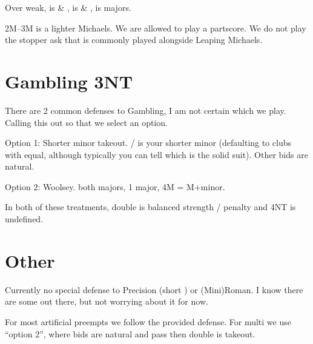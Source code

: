\documentclass[tom-ari]{subfile}
\begin{document}
	Over  weak,  is \clubsuit \& \heartsuit,  is \clubsuit \& \spadesuit,  is majors.
	
	2M--3M is a lighter Michaels. We are allowed to play a partscore. We do not play the stopper ask that is commonly played alongside Leaping Michaels.
		
	\section{Gambling 3NT}
	
	There are 2 common defenses to Gambling, I am not certain which we play. Calling this out so that we select an option.
	
	Option 1:  Shorter minor takeout. / is your shorter minor (defaulting to clubs with equal, although typically you can tell which is the solid suit). Other bids are natural.
	
	Option 2:  Woolsey.  both majors,  1 major, 4M = M+minor.
	
	In both of these treatments, double is balanced strength / penalty and 4NT is undefined.
	
	\section{Other}
	
	Currently no special defense to  Precision (short \diamondsuit) or (Mini)Roman. I know there are some out there, but not worrying about it for now.
	
	For most artificial preempts we follow the provided defense. For multi we use ``option 2'', where bids are natural and pass then double is takeout.
	
\end{document}
